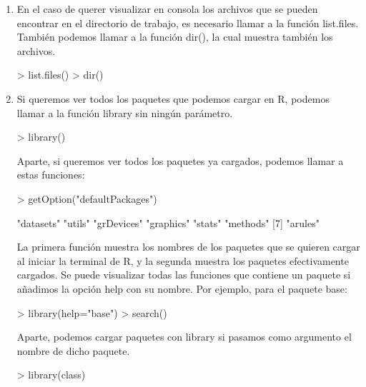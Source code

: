 \documentclass[parskip=full]{scrartcl}
\begin{document}
\begin{enumerate}
\item 
En el caso de querer visualizar en consola los archivos que se pueden encontrar en el
directorio de trabajo, es necesario llamar a la función list.files. También podemos llamar a
la función dir(), la cual muestra también los archivos.

\begin{Schunk}
\begin{Sinput}
> list.files()
> dir()
\end{Sinput}
\end{Schunk}


\item
Si queremos ver todos los paquetes que podemos cargar en R, podemos llamar a la función library
sin ningún parámetro.

\begin{Schunk}
\begin{Sinput}
> library()
\end{Sinput}
\end{Schunk}


Aparte, si queremos ver todos los paquetes ya cargados, podemos llamar a estas funciones:

\begin{Schunk}
\begin{Sinput}
> getOption("defaultPackages")
\end{Sinput}
\begin{Soutput}
[1] "datasets"  "utils"     "grDevices" "graphics"  "stats"     "methods"  
[7] "arules"   
\end{Soutput}
\end{Schunk}


La primera función muestra los nombres de los paquetes que se quieren cargar al iniciar la terminal de R, y la segunda muestra los paquetes efectivamente cargados.
Se puede visualizar todas las funciones que contiene un paquete si añadimos la opción help con
su nombre. Por ejemplo, para el paquete base:

\begin{Schunk}
\begin{Sinput}
> library(help="base")
> search()
\end{Sinput}
\end{Schunk}

Aparte, podemos cargar paquetes con library si pasamos como argumento el nombre de dicho paquete.

\begin{Schunk}
\begin{Sinput}
> library(class)
\end{Sinput}
\end{Schunk}


\end{enumerate}
\end{document}

